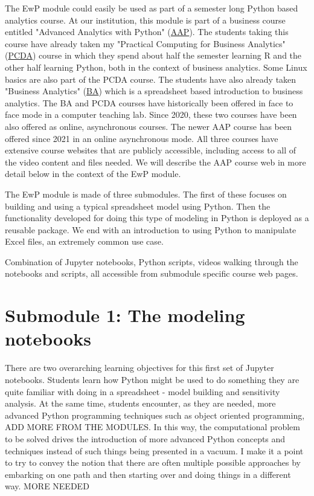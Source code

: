\documentclass[ited,blindrev]{informs3}              %
\begin{document}
The EwP module could easily be used as part of a semester long Python based analytics course. At our institution, this module is part of a business course entitled "Advanced Analytics with Python" (\href{http://www.sba.oakland.edu/faculty/isken/courses/mis6900}{AAP}). The students taking this course have already taken my "Practical Computing for Business Analytics" (\href{http://www.sba.oakland.edu/faculty/isken/courses/mis5470}{PCDA}) course in which they spend about half the semester learning R and the other half learning Python, both in the context of business analytics. Some Linux basics are also part of the PCDA course. The students have also already taken "Business Analytics" (\href{http://www.sba.oakland.edu/faculty/isken/courses/mis5460}{BA}) which is a spreadsheet based introduction to business analytics. The BA and PCDA courses have historically been offered in face to face mode in a computer teaching lab. Since 2020, these two courses have been also offered as online, asynchronous courses. The newer AAP course has been offered since 2021 in an online asynchronous mode. All three courses have extensive course websites that are publicly accessible, including access to all of the video content and files needed. We will describe the AAP course web in more detail below in the context of the EwP module.

The EwP module is made of three submodules. The first of these focuses on building and using a typical spreadsheet model using Python. Then the functionality developed for doing this type of modeling in Python is deployed as a reusable package. We end with an introduction to using Python to manipulate Excel files, an extremely common use case.

Combination of Jupyter notebooks, Python scripts, videos walking through the notebooks and scripts, all accessible from submodule specific course web pages. 

\section{Submodule 1: The modeling notebooks}

There are two overarching learning objectives for this first set of Jupyter notebooks. Students learn how Python might be used to do something they are quite familiar with doing in a spreadsheet - model building and sensitivity analysis. At the same time, students encounter, as they are needed, more advanced Python programming techniques such as object oriented programming, ADD MORE FROM THE MODULES. In this way, the computational problem to be solved drives the introduction of more advanced Python concepts and techniques instead of such things being presented in a vacuum. I make it a point to try to convey the notion that there are often multiple possible approaches by embarking on one path and then starting over and doing things in a different way. MORE NEEDED
 
\end{document}
